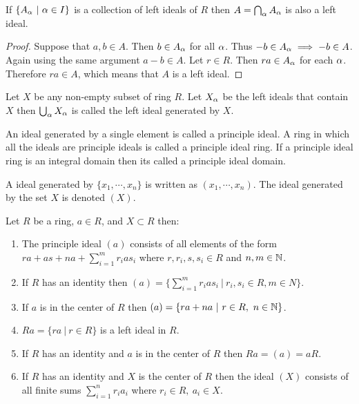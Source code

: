 \begin{corollary}
  If $\{A_\alpha\ |\ \alpha\in I\}$ is a collection of left ideals of $R$ then $A = \bigcap_\alpha A_\alpha$ is also a left ideal.
\end{corollary}
\begin{proof}
  Suppose that $a,b\in A$. Then $b\in A_\alpha$ for all $\alpha$. Thus $-b\in A_\alpha \implies -b\in A$. Again using the same argument $a-b\in A$. Let $r\in R$. Then $ra\in A_\alpha$ for each $\alpha$. Therefore $ra\in A$, which means that $A$ is a left ideal. 
\end{proof}
\begin{definition}
  Let $X$ be any non-empty subset of ring $R$. Let $X_\alpha$ be the left ideals that contain $X$ then $\bigcup_\alpha X_\alpha$ is called the left ideal generated by $X$.
\end{definition}
\begin{definition}
  An ideal generated by a single element is called a principle ideal. A ring in which all the ideals are principle ideals is called a principle ideal ring. If a principle ideal ring is an integral domain then its called a principle ideal domain.
\end{definition}
\begin{notation}
  A ideal generated by $\{x_1,\cdots, x_n\}$ is written as $(x_1,\cdots, x_n)$. The ideal generated by the set $X$ is denoted $(X)$.
\end{notation}
\begin{theorem}
  Let $R$ be a ring, $a\in R$, and $X\subset R$ then:
  \begin{enumerate}
    \item The principle ideal $(a)$ consists of  all elements of the form $ra+ as + na + \sum_{i=1}^m r_i a s_i$ where $r,r_i,s,s_i\in R$ and $n,m\in \mathbb{N}$.
    \item If $R$ has an identity then $(a) = \{\sum_{i=1}^m r_i a s_i\ |\ r_i,s_i \in R, m\in N\}$.
    \item If $a$ is in the center of $R$ then $(a) = \{ra+na\ |\ r\in R,\ n\in \mathbb{N}\}$.
    \item $Ra = \{ra\ |\ r\in R\}$ is a left ideal in $R$.
    \item If $R$ has an identity and $a$ is in the center of $R$ then $Ra = (a) = aR$.
    \item If $R$ has an identity and $X$ is the center of $R$ then the ideal $(X)$ consists of all finite sums $\sum_{i=1}^n r_ia_i$ where $r_i\in R,\ a_i\in X$.
  \end{enumerate}
\end{theorem}
